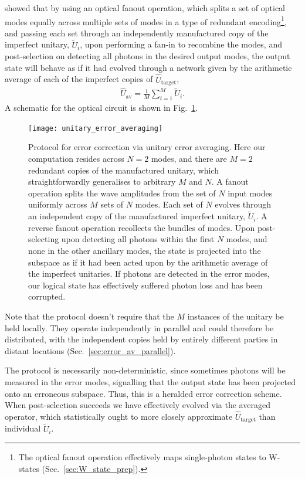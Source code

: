 \cite{MarshmanLundRohdeRalph} showed that by using an optical fanout operation, which splits a set of optical modes equally across multiple sets of modes in a type of redundant encoding\footnote{The optical fanout operation effectively maps single-photon states to W-states (Sec.~\ref{sec:W_state_prep}).}, and passing each set through an independently manufactured copy of the imperfect unitary, $\tilde{U}_i$, upon performing a fan-in to recombine the modes, and post-selection on detecting all photons in the desired output modes, the output state will behave as if it had evolved through a network given by the arithmetic average of each of the imperfect copies of $\hat{U}_\mathrm{target}$,
\begin{align}
\hat{U}_\mathrm{av} = \frac{1}{M}\sum_{i=1}^M \tilde{U}_i.	
\end{align}
A schematic for the optical circuit is shown in Fig.~\ref{fig:error_av_circuit}.

\begin{figure}[htpb]
\texttt{[image: unitary\_error\_averaging]}
\caption{Protocol for error correction via unitary error averaging. Here our computation resides across \mbox{$N=2$} modes, and there are \mbox{$M=2$} redundant copies of the manufactured unitary, which straightforwardly generalises to arbitrary $M$ and $N$. A fanout operation splits the wave amplitudes from the set of $N$ input modes uniformly across $M$ sets of $N$ modes. Each set of $N$ evolves through an independent copy of the manufactured imperfect unitary, $\tilde{U}_i$. A reverse fanout operation recollects the bundles of modes. Upon post-selecting upon detecting all photons within the first $N$ modes, and none in the other ancillary modes, the state is projected into the subspace as if it had been acted upon by the arithmetic average of the imperfect unitaries. If photons are detected in the error modes, our logical state has effectively suffered photon loss and has been corrupted.} \label{fig:error_av_circuit}	
\end{figure}

Note that the protocol doesn't require that the $M$ instances of the unitary be held locally. They operate independently in parallel and could therefore be distributed, with the independent copies held by entirely different parties in distant locations (Sec.~\ref{sec:error_av_parallel}).

The protocol is necessarily non-deterministic, since sometimes photons will be measured in the error modes, signalling that the output state has been projected onto an erroneous subspace. Thus, this is a heralded error correction scheme. When post-selection succeeds we have effectively evolved via the averaged operator, which statistically ought to more closely approximate $\hat{U}_\mathrm{target}$ than individual $\tilde{U}_i$.

